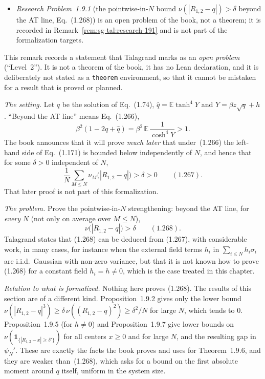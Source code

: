 \begin{remark}
\begin{itemize}
\item \emph{Research Problem~1.9.1} (the pointwise-in-$N$ bound $\nu(|R_{1,2}-q|)>\delta$ beyond the AT line, Eq.~(1.268)) is an open problem of the book, not a theorem; it is recorded in Remark~\ref{rem:sg-tal:research-191} and is not part of the formalization targets.
\end{itemize}
\end{remark}

\begin{remark}
\label{rem:sg-tal:research-191}
This remark records a statement that Talagrand marks as an \emph{open problem} (``Level~2''). It is not a theorem of the book, it has no Lean declaration, and it is deliberately not stated as a \texttt{theorem} environment, so that it cannot be mistaken for a result that is proved or planned.

\emph{The setting.} Let $q$ be the solution of Eq.~(1.74), $\widehat q=\mathbb E\tanh^4 Y$ and $Y=\beta z\sqrt q+h$. ``Beyond the AT line'' means Eq.~(1.266),
\[
\beta^2(1-2q+\widehat q)=\beta^2\,\mathbb E\,\frac1{\cosh^4 Y}>1 .
\]
The book announces that it will prove \emph{much later} that under~(1.266) the left-hand side of Eq.~(1.171) is bounded below independently of $N$, and hence that for some $\delta>0$ independent of $N$,
\[
\frac1N\sum_{M\le N}\nu_M\bigl(|R_{1,2}-q|\bigr)>\delta>0 \qquad(1.267).
\]
That later proof is not part of this formalization.

\emph{The problem.} Prove the pointwise-in-$N$ strengthening: beyond the AT line, for \emph{every} $N$ (not only on average over $M\le N$),
\[
\nu\bigl(|R_{1,2}-q|\bigr)>\delta \qquad(1.268).
\]
Talagrand states that (1.268) can be deduced from (1.267), with considerable work, in many cases, for instance when the external field terms $h_i$ in $\sum_{i\le N}h_i\sigma_i$ are i.i.d.\ Gaussian with non-zero variance, but that it is not known how to prove (1.268) for a constant field $h_i=h\ne0$, which is the case treated in this chapter.

\emph{Relation to what is formalized.} Nothing here proves (1.268). The results of this section are of a different kind. Proposition~1.9.2 gives only the lower bound $\nu(|R_{1,2}-q|^3)\ge\delta\,\nu((R_{1,2}-q)^2)\ge\delta^2/N$ for large $N$, which tends to $0$. Proposition~1.9.5 (for $h\ne0$) and Proposition~1.9.7 give lower bounds on $\nu(\mathbf 1_{\{|R_{1,2}-x|\ge\delta'\}})$ for all centers $x\ge0$ and for large $N$, and the resulting gap in $\psi_N'$. These are exactly the facts the book proves and uses for Theorem~1.9.6, and they are weaker than~(1.268), which asks for a bound on the first absolute moment around $q$ itself, uniform in the system size.
\end{remark}

